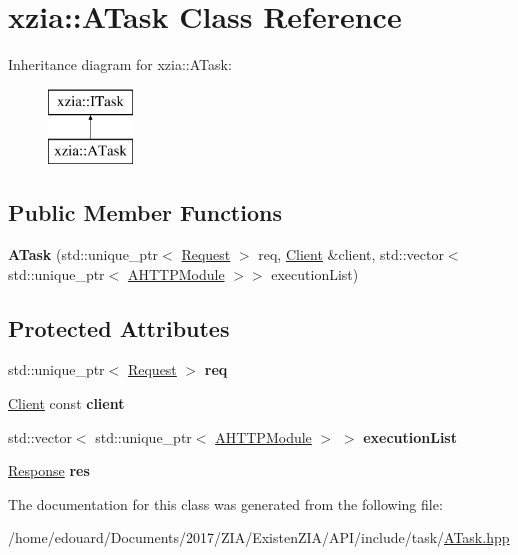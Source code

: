 \hypertarget{classxzia_1_1ATask}{}\section{xzia\+:\+:A\+Task Class Reference}
\label{classxzia_1_1ATask}
Inheritance diagram for xzia\+:\+:A\+Task\+:\begin{figure}[H]
\begin{center}
\leavevmode
\includegraphics[height=2.000000cm]{classxzia_1_1ATask}
\end{center}
\end{figure}
\subsection*{Public Member Functions}
\begin{DoxyCompactItemize}
\item 
\mbox{\label{classxzia_1_1ATask_a5c416483d4d81763f66c03977554e248}} 
{\bfseries A\+Task} (std\+::unique\+\_\+ptr$<$ \mbox{\hyperlink{structxzia_1_1Request}{Request}} $>$ req, \mbox{\hyperlink{structClient}{Client}} \&client, std\+::vector$<$ std\+::unique\+\_\+ptr$<$ \mbox{\hyperlink{classxzia_1_1AHTTPModule}{A\+H\+T\+T\+P\+Module}} $>$$>$ execution\+List)
\end{DoxyCompactItemize}
\subsection*{Protected Attributes}
\begin{DoxyCompactItemize}
\item 
\mbox{\label{classxzia_1_1ATask_a5ac92f779f43dcc9fef86687363760b7}} 
std\+::unique\+\_\+ptr$<$ \mbox{\hyperlink{structxzia_1_1Request}{Request}} $>$ {\bfseries req}
\item 
\mbox{\label{classxzia_1_1ATask_a9148283ddbcf712e6ab58afb96f3c221}} 
\mbox{\hyperlink{structClient}{Client}} const {\bfseries client}
\item 
\mbox{\label{classxzia_1_1ATask_ac8c8f0f62792705d3e699443e1c8771c}} 
std\+::vector$<$ std\+::unique\+\_\+ptr$<$ \mbox{\hyperlink{classxzia_1_1AHTTPModule}{A\+H\+T\+T\+P\+Module}} $>$ $>$ {\bfseries execution\+List}
\item 
\mbox{\label{classxzia_1_1ATask_a65180c95061234e32d42d7313e241a28}} 
\mbox{\hyperlink{structxzia_1_1Response}{Response}} {\bfseries res}
\end{DoxyCompactItemize}


The documentation for this class was generated from the following file\+:\begin{DoxyCompactItemize}
\item 
/home/edouard/\+Documents/2017/\+Z\+I\+A/\+Existen\+Z\+I\+A/\+A\+P\+I/include/task/\mbox{\hyperlink{ATask_8hpp}{A\+Task.\+hpp}}\end{DoxyCompactItemize}

